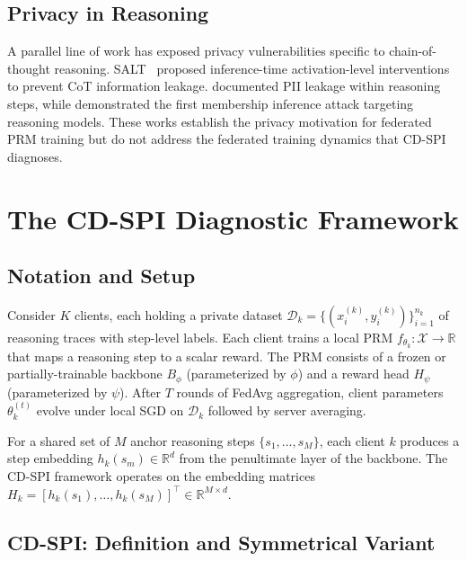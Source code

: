 \documentclass{article}
\begin{document}
\subsection{Privacy in Reasoning}

A parallel line of work has exposed privacy vulnerabilities specific to chain-of-thought reasoning.
SALT~\cite{salt2025} proposed inference-time activation-level interventions to prevent CoT information leakage.
\citet{saferreasoning2026} documented PII leakage within reasoning steps, while \citet{reasoningmembership2026} demonstrated the first membership inference attack targeting reasoning models.
These works establish the privacy motivation for federated PRM training but do not address the federated training dynamics that CD-SPI diagnoses.

\section{The CD-SPI Diagnostic Framework}

\subsection{Notation and Setup}

Consider $K$ clients, each holding a private dataset $\mathcal{D}_k = \{(x^{(k)}_i, y^{(k)}_i)\}_{i=1}^{n_k}$ of reasoning traces with step-level labels.
Each client trains a local PRM $f_{\theta_k}: \mathcal{X} \rightarrow \mathbb{R}$ that maps a reasoning step to a scalar reward.
The PRM consists of a frozen or partially-trainable backbone $B_\phi$ (parameterized by $\phi$) and a reward head $H_\psi$ (parameterized by $\psi$).
After $T$ rounds of FedAvg aggregation, client parameters $\theta_k^{(t)}$ evolve under local SGD on $\mathcal{D}_k$ followed by server averaging.

For a shared set of $M$ anchor reasoning steps $\{s_1, \ldots, s_M\}$, each client $k$ produces a step embedding $h_k(s_m) \in \mathbb{R}^d$ from the penultimate layer of the backbone.
The CD-SPI framework operates on the embedding matrices $H_k = [h_k(s_1), \ldots, h_k(s_M)]^\top \in \mathbb{R}^{M \times d}$.

\subsection{CD-SPI: Definition and Symmetrical Variant}
\end{document}
